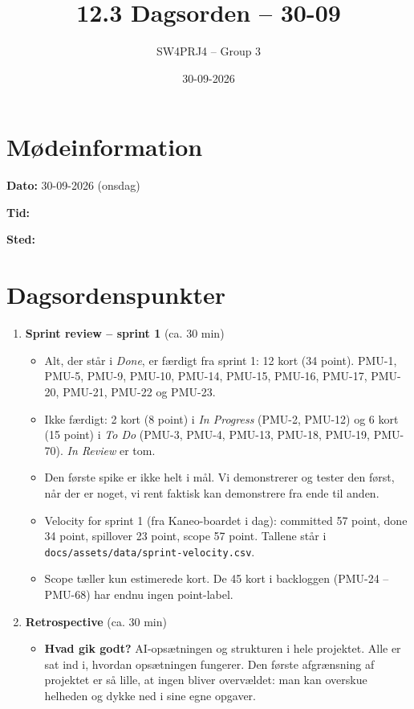 \documentclass[a4paper,11pt]{article}
\title{12.3 Dagsorden -- 30-09}
\author{SW4PRJ4 -- Group 3}
\date{30-09-2026}
\begin{document}
\maketitle

\section*{Mødeinformation}

\textbf{Dato:} 30-09-2026 (onsdag)

\textbf{Tid:}

\textbf{Sted:}

\section*{Dagsordenspunkter}

\begin{enumerate}
    \item \textbf{Sprint review -- sprint 1} (ca. 30 min)
    \begin{itemize}
        \item Alt, der står i \emph{Done}, er færdigt fra sprint 1: 12 kort (34 point). PMU-1, PMU-5, PMU-9, PMU-10, PMU-14, PMU-15, PMU-16, PMU-17, PMU-20, PMU-21, PMU-22 og PMU-23.
        \item Ikke færdigt: 2 kort (8 point) i \emph{In Progress} (PMU-2, PMU-12) og 6 kort (15 point) i \emph{To Do} (PMU-3, PMU-4, PMU-13, PMU-18, PMU-19, PMU-70). \emph{In Review} er tom.
        \item Den første spike er ikke helt i mål. Vi demonstrerer og tester den først, når der er noget, vi rent faktisk kan demonstrere fra ende til anden.
        \item Velocity for sprint 1 (fra Kaneo-boardet i dag): committed 57 point, done 34 point, spillover 23 point, scope 57 point. Tallene står i \texttt{docs/assets/data/sprint-velocity.csv}.
        \item Scope tæller kun estimerede kort. De 45 kort i backloggen (PMU-24 -- PMU-68) har endnu ingen point-label.
    \end{itemize}
    \item \textbf{Retrospective} (ca. 30 min)
    \begin{itemize}
        \item \textbf{Hvad gik godt?} AI-opsætningen og strukturen i hele projektet. Alle er sat ind i, hvordan opsætningen fungerer. Den første afgrænsning af projektet er så lille, at ingen bliver overvældet: man kan overskue helheden og dykke ned i sine egne opgaver.

\end{itemize}
\end{enumerate}
\end{document}

